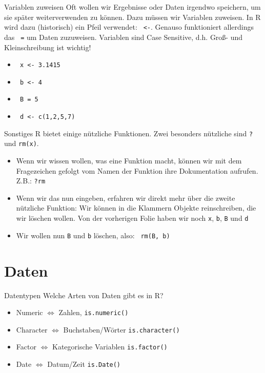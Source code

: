 \documentclass[xcolor=dvipsnames, aspectratio = 169]{beamer}
\begin{document}
\begin{frame}[fragile]{Variablen zuweisen}
Oft wollen wir Ergebnisse oder Daten irgendwo speichern, um sie später weiterverwenden zu können. Dazu müssen wir Variablen zuweisen. In R wird dazu (historisch) ein Pfeil verwendet: \verb+ <-+. Genauso funktioniert allerdings das \verb+ =+ um Daten zuzuweisen. Variablen sind \glqq Case Sensitive\grqq{}, d.h. Groß- und Kleinschreibung ist wichtig!
\begin{itemize}
	\item \verb+ x <- 3.1415+
	\item \verb+ b <- 4+
	\item \verb+ B = 5+
	\item \verb+ d <- c(1,2,5,7)+
\end{itemize}
\end{frame}

\begin{frame}[fragile]{Sonstiges}
R bietet einige nützliche Funktionen. Zwei besonders nützliche sind \verb+?+ und \verb+rm(x)+.
\begin{itemize}
	\item Wenn wir wissen wollen, was eine Funktion macht, können wir mit dem Fragezeichen gefolgt vom Namen der Funktion ihre Dokumentation aufrufen. Z.B.: \verb+?rm+
	\item Wenn wir das nun eingeben, erfahren wir direkt mehr über die zweite nützliche Funktion: Wir können in die Klammern Objekte reinschreiben, die wir löschen wollen. Von der vorherigen Folie haben wir noch \verb+x+, \verb+b+, \verb+B+ und \verb+d+
	\item Wir wollen nun \verb+B+ und \verb+b+ löschen, also: \verb+ rm(B, b)+
\end{itemize}
\end{frame}

\section{Daten}
\begin{frame}[fragile]{Datentypen}
	Welche Arten von Daten gibt es in R?
	\begin{itemize}
		\item Numeric $\Leftrightarrow$ Zahlen, \verb+is.numeric()+
		\item Character $\Leftrightarrow$ Buchstaben/Wörter \verb+is.character()+
		\item Factor $\Leftrightarrow$ Kategorische Variablen \verb+is.factor()+
		\item Date $\Leftrightarrow$ Datum/Zeit \verb+is.Date()+
	\end{itemize}
\end{frame}
\end{document}
